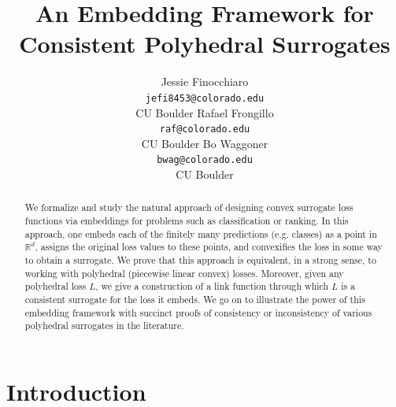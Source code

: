 \documentclass[12pt]{article}
\title{An Embedding Framework for Consistent Polyhedral Surrogates}
\author{%
 Jessie Finocchiaro \\
 \texttt{jefi8453@colorado.edu}\\
 CU Boulder
 \And
 Rafael Frongillo\\
 \texttt{raf@colorado.edu}\\
 CU Boulder
 \And
 Bo Waggoner\\
 \texttt{bwag@colorado.edu}\\
 CU Boulder
}
\newcommand{\Comments}{1}
\newcommand{\mynote}[2]{\ifnum\Comments=1\textcolor{#1}{#2}\fi}
\newcommand{\raf}[1]{\mynote{green}{[RF: #1]}}
\newcommand{\reals}{\mathbb{R}}
\begin{document}
\maketitle

\begin{abstract}
We formalize and study the natural approach of designing convex surrogate loss functions via embeddings for problems such as classification or ranking. In this approach, one embeds each of the finitely many predictions (e.g. classes) as a point in $\reals^d$, assigns the original loss values to these points, and convexifies the loss in some way to obtain a surrogate.
We prove that this approach is equivalent, in a strong sense, to working with polyhedral (piecewise linear convex) losses.
Moreover, given any polyhedral loss $L$, we give a construction of a link function through which $L$ is a consistent surrogate for the loss it embeds.
We go on to illustrate the power of this embedding framework with succinct proofs of consistency or inconsistency of various polyhedral surrogates in the literature.
\end{abstract}



\section{Introduction}\label{sec:intro}
\end{document}
